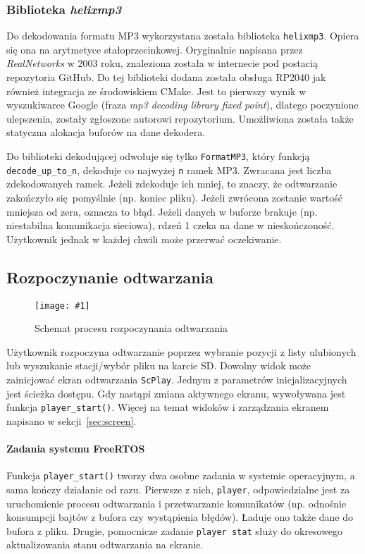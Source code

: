\documentclass[polish]{aghengthesis}
\newcommand{\imgint}[4]{
	\begin{figure}[{#4}]
		\centering
		\texttt{[image: \#1]}
		\caption{#2}
		\label{#1}
	\end{figure}
}
\newcommand{\imgcs}[3]{\imgint{#1}{#2}{#3}{}}
\begin{document}
		\subsubsection{Biblioteka \textit{helixmp3}}
			Do dekodowania formatu MP3 wykorzystana została biblioteka \lstinline|helixmp3|. Opiera się ona na arytmetyce stałoprzecinkowej. Oryginalnie napisana przez \textit{RealNetworks}\textsuperscript{\cite{realnetworks}} w 2003 roku, znaleziona została w internecie pod postacią repozytoria GitHub\textsuperscript{\cite{helixmp3_repo}}. Do tej biblioteki dodana została obsługa RP2040 jak również integracja ze środowiskiem CMake. Jest to pierwszy wynik w wyszukiwarce Google (fraza \textit{mp3 decoding library fixed point}), dlatego poczynione ulepszenia, zostały zgłoszone autorowi repozytorium\textsuperscript{\cite{helixmp3_pr}}. Umożliwiona została także statyczna alokacja buforów na dane dekodera.
			
			Do biblioteki dekodującej odwołuje się tylko \lstinline|FormatMP3|, który funkcją \lstinline|decode_up_to_n|, dekoduje co najwyżej \lstinline|n| ramek MP3. Zwracana jest liczba zdekodowanych ramek. Jeżeli zdekoduje ich mniej, to znaczy, że odtwarzanie zakończyło się pomyślnie (np. koniec pliku). Jeżeli zwrócona zostanie wartość mniejsza od zera, oznacza to błąd. Jeżeli danych w buforze brakuje (np. niestabilna komunikacja sieciowa), rdzeń 1 czeka na dane w nieskończoność. Użytkownik jednak w każdej chwili może przerwać oczekiwanie.
		
		\subsection{Rozpoczynanie odtwarzania}
			\imgcs{3/PicoRadio-start}{Schemat procesu rozpoczynania odtwarzania}{0.7}
			Użytkownik rozpoczyna odtwarzanie poprzez wybranie pozycji z listy ulubionych lub wyszukanie stacji/wybór pliku na karcie SD. Dowolny widok może zainicjować ekran odtwarzania \lstinline|ScPlay|. Jednym z parametrów inicjalizacyjnych jest ścieżka dostępu. Gdy nastąpi zmiana aktywnego ekranu, wywoływana jest funkcja \lstinline|player_start()|. Więcej na temat widoków i zarządzania ekranem napisano w sekcji~\ref{sec:screen}.
			
			\paragraph{Zadania systemu FreeRTOS}
				Funkcja \lstinline|player_start()| tworzy dwa osobne zadania w systemie operacyjnym, a sama kończy działanie od razu. Pierwsze z nich, \lstinline|player|, odpowiedzialne jest za uruchomienie procesu odtwarzania i przetwarzanie komunikatów (np. odnośnie konsumpcji bajtów z bufora czy wystąpienia błędów). Ładuje ono także dane do bufora z pliku. Drugie, pomocnicze zadanie \lstinline|player stat| służy do okresowego aktualizowania stanu odtwarzania na ekranie.
			
\end{document}
